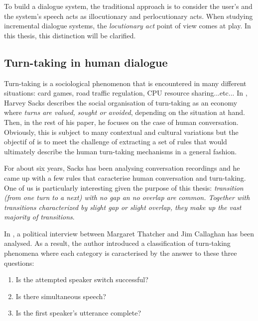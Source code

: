         To build a dialogue system, the traditional approach is to consider the user's and the system's speech acts as illocutionary and perlocutionary acts. When studying incremental dialogue systems, the \textit{locutionary act} point of view comes at play. In this thesis, this distinction will be clarified.
        
    \subsection{Turn-taking in human dialogue}
    \label{soa:ttphuman}
    
    
    	Turn-taking is a sociological phenomenon that is encountered in many different situations: card games, road traffic regulation, CPU resource sharing...etc... In \cite{Sacks1974}, Harvey Sacks describes the social organisation of turn-taking as an economy where \textit{turns are valued, sought or avoided}, depending on the situation at hand. Then, in the rest of his paper, he focuses on the case of human conversation. Obviously, this is subject to many contextual and cultural variations but the objectif of \cite{Sacks1974} is to meet the challenge of extracting a set of rules that would ultimately describe the human turn-taking mechanisms in a general fashion.
        
        For about six years, Sacks has been analysing conversation recordings and he came up with a few rules that caracterise human conversation and turn-taking. One of us is particularly interesting given the purpose of this thesis: \textit{transition (from one turn to a next) with no gap an no overlap are common. Together with transitions characterized by slight gap or slight overlap, they make up the vast majority of transitions}.
        
        In \cite{Beattie1982}, a political interview between Margaret Thatcher and Jim Callaghan has been analysed. As a result, the author introduced a classification of turn-taking phenomena where each category is caracterised by the answer to these three questions:
        
        \begin{enumerate}
            \item Is the attempted speaker switch successful?
            \item Is there simultaneous speech?
            \item Is the first speaker's utterance complete?
        \end{enumerate}
        
